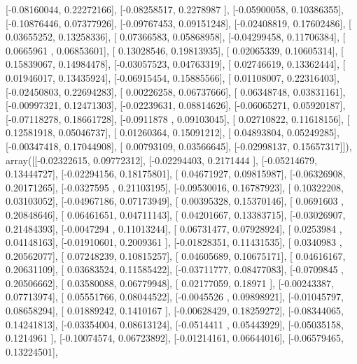 \documentclass{article}
\begin{document}
       [-0.08160044,  0.22272166],
       [-0.08258517,  0.2278987 ],
       [-0.05900058,  0.10386355],
       [-0.10876446,  0.07377926],
       [-0.09767453,  0.09151248],
       [-0.02408819,  0.17602486],
       [ 0.03655252,  0.13258336],
       [ 0.07366583,  0.05868958],
       [-0.04299458,  0.11706384],
       [ 0.0665961 ,  0.06853601],
       [ 0.13028546,  0.19813935],
       [ 0.02065339,  0.10605314],
       [ 0.15839067,  0.14984478],
       [-0.03057523,  0.04763319],
       [ 0.02746619,  0.13362444],
       [ 0.01946017,  0.13435924],
       [-0.06915454,  0.15885566],
       [ 0.01108007,  0.22316403],
       [-0.02450803,  0.22694283],
       [ 0.00226258,  0.06737666],
       [ 0.06348748,  0.03831161],
       [-0.00997321,  0.12471303],
       [-0.02239631,  0.08814626],
       [-0.06065271,  0.05920187],
       [-0.07118278,  0.18661728],
       [-0.0911878 ,  0.09103045],
       [ 0.02710822,  0.11618156],
       [ 0.12581918,  0.05046737],
       [ 0.01260364,  0.15091212],
       [ 0.04893804,  0.05249285],
       [-0.00347418,  0.17044908],
       [ 0.00793109,  0.03566645],
       [-0.02998137,  0.15657317]]), array([[-0.02322615,  0.09772312],
       [-0.02294403,  0.2171444 ],
       [-0.05214679,  0.13444727],
       [-0.02294156,  0.18175801],
       [ 0.04671927,  0.09815987],
       [-0.06326908,  0.20171265],
       [-0.0327595 ,  0.21103195],
       [-0.09530016,  0.16787923],
       [ 0.10322208,  0.03103052],
       [-0.04967186,  0.07173949],
       [ 0.00395328,  0.15370146],
       [ 0.0691603 ,  0.20848646],
       [ 0.06461651,  0.04711143],
       [ 0.04201667,  0.13383715],
       [-0.03026907,  0.21484393],
       [-0.0047294 ,  0.11013244],
       [ 0.06731477,  0.07928924],
       [ 0.0253984 ,  0.04148163],
       [-0.01910601,  0.2009361 ],
       [-0.01828351,  0.11431535],
       [ 0.0340983 ,  0.20562077],
       [ 0.07248239,  0.10815257],
       [ 0.04605689,  0.10675171],
       [ 0.04616167,  0.20631109],
       [ 0.03683524,  0.11585422],
       [-0.03711777,  0.08477083],
       [-0.0709845 ,  0.20506662],
       [ 0.03580088,  0.06779948],
       [ 0.02177059,  0.18971   ],
       [-0.00243387,  0.07713974],
       [ 0.05551766,  0.08044522],
       [-0.0045526 ,  0.09898921],
       [-0.01045797,  0.08658294],
       [ 0.01889242,  0.1410167 ],
       [-0.00628429,  0.18259272],
       [-0.08344065,  0.14241813],
       [-0.03354004,  0.08613124],
       [-0.0514411 ,  0.05443929],
       [-0.05035158,  0.1214961 ],
       [-0.10074574,  0.06723892],
       [-0.01214161,  0.06644016],
       [-0.06579465,  0.13224501],
\end{document}
